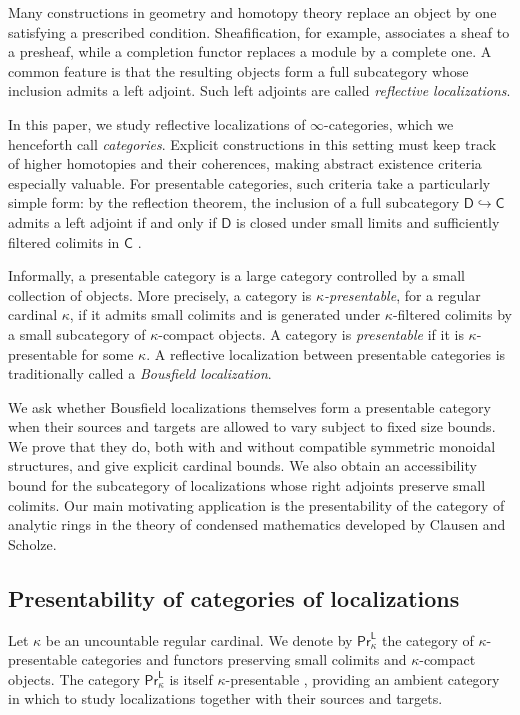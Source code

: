Many constructions in geometry and homotopy theory replace an object by one satisfying a prescribed condition. Sheafification, for example, associates a sheaf to a presheaf, while a completion functor replaces a module by a complete one. A common feature is that the resulting objects form a full subcategory whose inclusion admits a left adjoint. Such left adjoints are called \emph{reflective localizations}.

In this paper, we study reflective localizations of $\infty$-categories, which we henceforth call \emph{categories}. Explicit constructions in this setting must keep track of higher homotopies and their coherences, making abstract existence criteria especially valuable. For presentable categories, such criteria take a particularly simple form: by the reflection theorem, the inclusion of a full subcategory $\mathsf{D}\hookrightarrow\mathsf{C}$ admits a left adjoint if and only if $\mathsf{D}$ is closed under small limits and sufficiently filtered colimits in $\mathsf{C}$ \cite[Thm.~1.1]{reflectionprinciple}.

Informally, a presentable category is a large category controlled by a small collection of objects. More precisely, a category is \emph{$\kappa$-presentable}, for a regular cardinal $\kappa$, if it admits small colimits and is generated under $\kappa$-filtered colimits by a small subcategory of $\kappa$-compact objects. A category is \emph{presentable} if it is $\kappa$-presentable for some $\kappa$. A reflective localization between presentable categories is traditionally called a \emph{Bousfield localization}.

We ask whether Bousfield localizations themselves form a presentable category when their sources and targets are allowed to vary subject to fixed size bounds. We prove that they do, both with and without compatible symmetric monoidal structures, and give explicit cardinal bounds. We also obtain an accessibility bound for the subcategory of localizations whose right adjoints preserve small colimits. Our main motivating application is the presentability of the category of analytic rings in the theory of condensed mathematics developed by Clausen and Scholze.

\subsection*{Presentability of categories of localizations}

Let $\kappa$ be an uncountable regular cardinal. We denote by $\mathsf{Pr}^{\mathsf{L}}_\kappa$ the category of $\kappa$-presentable categories and functors preserving small colimits and $\kappa$-compact objects. The category $\mathsf{Pr}^{\mathsf{L}}_\kappa$ is itself $\kappa$-presentable \cite[Prop.~2.3]{aoki2025higherpresentablecategorieslimits}, providing an ambient category in which to study localizations together with their sources and targets.

